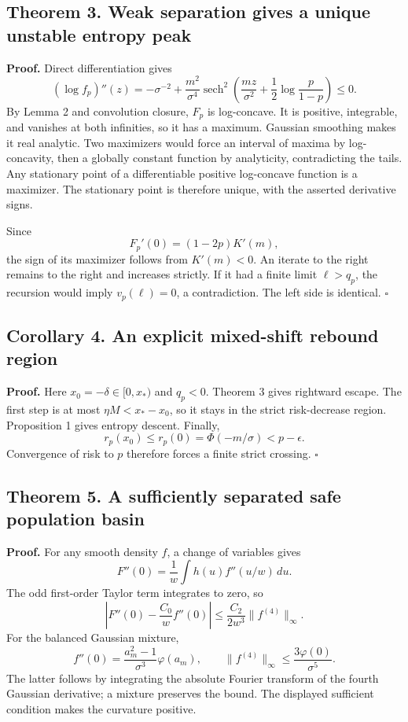\subsection{Theorem 3. Weak separation gives a unique unstable entropy
peak}\label{gaussian_proofs-theorem-3.-weak-separation-gives-a-unique-unstable-entropy-peak}

\textbf{Proof.} Direct differentiation gives \[
(\log f_p)''(z)=
-\sigma^{-2}+\frac{m^2}{\sigma^4}
\operatorname{sech}^2\!\left(
\frac{mz}{\sigma^2}+\frac12\log\frac p{1-p}\right)\le0.
\] By Lemma 2 and convolution closure, \(F_p\) is log-concave. It is
positive, integrable, and vanishes at both infinities, so it has a
maximum. Gaussian smoothing makes it real analytic. Two maximizers would
force an interval of maxima by log-concavity, then a globally constant
function by analyticity, contradicting the tails. Any stationary point
of a differentiable positive log-concave function is a maximizer. The
stationary point is therefore unique, with the asserted derivative
signs.

Since \[
F_p'(0)=(1-2p)K'(m),
\] the sign of its maximizer follows from \(K'(m)<0\). An iterate to the
right remains to the right and increases strictly. If it had a finite
limit \(\ell>q_p\), the recursion would imply \(v_p(\ell)=0\), a
contradiction. The left side is identical. \(\square\)

\subsection{Corollary 4. An explicit mixed-shift rebound
region}\label{gaussian_proofs-corollary-4.-an-explicit-mixed-shift-rebound-region}

\textbf{Proof.} Here \(x_0=-\delta\in[0,x_*)\) and \(q_p<0\). Theorem 3
gives rightward escape. The first step is at most \(\eta M<x_*-x_0\), so
it stays in the strict risk-decrease region. Proposition 1 gives entropy
descent. Finally, \[
r_p(x_0)\le r_p(0)=\Phi(-m/\sigma)<p-\epsilon.
\] Convergence of risk to \(p\) therefore forces a finite strict
crossing. \(\square\)

\subsection{Theorem 5. A sufficiently separated safe population
basin}\label{gaussian_proofs-theorem-5.-a-sufficiently-separated-safe-population-basin}

\textbf{Proof.} For any smooth density \(f\), a change of variables
gives \[
F''(0)=\frac1w\int h(u)f''(u/w)\,du.
\] The odd first-order Taylor term integrates to zero, so \[
\left|F''(0)-\frac{C_0}{w}f''(0)\right|
\le\frac{C_2}{2w^3}\|f^{(4)}\|_\infty.
\] For the balanced Gaussian mixture, \[
f''(0)=\frac{a_m^2-1}{\sigma^3}\varphi(a_m),\qquad
\|f^{(4)}\|_\infty\le\frac{3\varphi(0)}{\sigma^5}.
\] The latter follows by integrating the absolute Fourier transform of
the fourth Gaussian derivative; a mixture preserves the bound. The
displayed sufficient condition makes the curvature positive.

